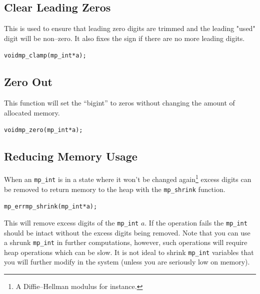 \documentclass[synpaper]{book}
\begin{document}
\subsection{Clear Leading Zeros}

This is used to ensure that leading zero digits are trimmed and the leading "used" digit will be
non--zero. It also fixes the sign if there are no more leading digits.

\begin{alltt}
void mp_clamp(mp_int *a);
\end{alltt}

\subsection{Zero Out}

This function will set the ``bigint'' to zeros without changing the amount of allocated memory.

\begin{alltt}
void mp_zero(mp_int *a);
\end{alltt}

\subsection{Reducing Memory Usage}
When an \texttt{mp\_int} is in a state where it won't be changed again\footnote{A Diffie--Hellman
  modulus for instance.} excess digits can be removed to return memory to the heap with the
\texttt{mp\_shrink} function.

\begin{alltt}
mp_err mp_shrink (mp_int *a);
\end{alltt}

This will remove excess digits of the \texttt{mp\_int} $a$.  If the operation fails the
\texttt{mp\_int} should be intact without the excess digits being removed.  Note that you can use a
shrunk \texttt{mp\_int} in further computations, however, such operations will require heap
operations which can be slow.  It is not ideal to shrink \texttt{mp\_int} variables that you will
further modify in the system (unless you are seriously low on memory).
\end{document}
